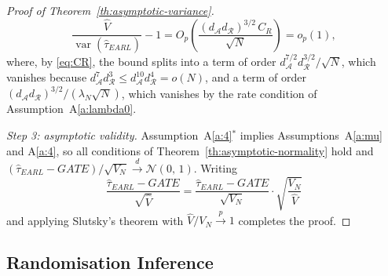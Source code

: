 \documentclass[sigconf,nonacm]{acmart}
\DeclareMathOperator{\var}{var}
\begin{document}
\begin{proof}[Proof of Theorem~\ref{th:asymptotic-variance}]
    \begin{equation*}
        \frac{\hat V}{\var(\hat\tau^{\phantom{1}}_{EARL})} - 1 = O_p\left(\frac{(d_{\mathcal A}d_{\mathcal R})^{3/2}\,C_R}{\sqrt N}\right) = o_p(1),
    \end{equation*}
    where, by \eqref{eq:CR}, the bound splits into a term of order $d^{7/2}_{\mathcal A}d^{3/2}_{\mathcal R}/\sqrt N$, which vanishes because $d^{7}_{\mathcal A}d^{3}_{\mathcal R}\le d^{10}_{\mathcal A}d^{4}_{\mathcal R} = o(N)$, and a term of order $(d_{\mathcal A}d_{\mathcal R})^{3/2}/(\lambda_N\sqrt N)$, which vanishes by the rate condition of Assumption~A\ref{a:lambda0}.

    \emph{Step 3: asymptotic validity.} Assumption~A\ref{a:4}$^*$ implies Assumptions~A\ref{a:mu} and A\ref{a:4}, so all conditions of Theorem~\ref{th:asymptotic-normality} hold and $(\hat\tau_{EARL}-GATE)/\sqrt{V_N}\stackrel{d}{\to}\mathcal N(0,\,1)$. Writing
    \begin{equation*}
        \frac{\hat\tau^{\phantom{1}}_{EARL} - GATE}{\sqrt{\hat V}} = \frac{\hat\tau^{\phantom{1}}_{EARL} - GATE}{\sqrt{V_N}}\cdot\sqrt{\frac{V_N}{\hat V}}
    \end{equation*}
    and applying Slutsky's theorem with $\hat V/V_N\stackrel{p}{\to}1$ completes the proof.
\end{proof}

\subsection{Randomisation Inference}\label{app:ri}
\end{document}
